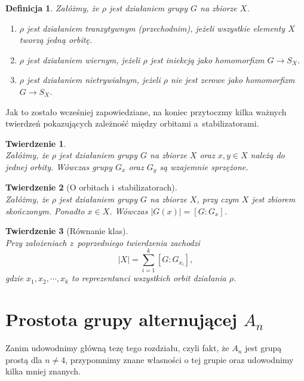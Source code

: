 \documentclass[licencjacka]{pracamgr}
\newtheorem{deff}{Definicja}[section]
\newtheorem{thh}{Twierdzenie}[section]
\begin{document}
\begin{deff}
	Załóżmy, że $\rho$ jest działaniem grupy $G$ na zbiorze $X$.
	\begin{enumerate}[label=\alph*)]
	 \item \emph{$\rho$ jest działaniem tranzytywnym (przechodnim)}, jeżeli wszystkie elementy $X$ tworzą jedną orbitę.
	 \item \emph{$\rho$ jest działaniem wiernym}, jeżeli $\rho$ jest iniekcją jako homomorfizm $G \to S_X$.
	 \item \emph{$\rho$ jest działaniem nietrywialnym}, jeżeli $\rho$ nie jest zerowe jako homomorfizm $G \to S_X$.
	\end{enumerate}
\end{deff}

Jak to zostało wcześniej zapowiedziane, na koniec przytoczmy kilka ważnych twierdzeń pokazujących zależność między orbitami a~stabilizatorami.

\begin{thh}\label{conj_stab} $ $\\
	Załóżmy, że $\rho$ jest działaniem grupy $G$ na zbiorze $X$ oraz $x, y \in X$ należą do jednej orbity.
	Wówczas grupy $G_x$ oraz $G_y$ są wzajemnie sprzężone.
\end{thh}

\begin{thh}[O orbitach i~stabilizatorach] $ $\\
	Załóżmy, że $\rho$ jest działaniem grupy $G$ na zbiorze $X$, przy czym $X$ jest zbiorem skończonym.
	Ponadto $x \in X$. 
	Wówczas $|G(x)| = [G : G_x]$.
\end{thh}

\begin{thh}[Równanie klas] $ $\\
	Przy założeniach z~poprzedniego twierdzenia zachodzi
	$$ |X| = \sum_{i=1}^k [G : G_{x_i}] ,$$
	gdzie $x_1, x_2, \cdots, x_k$ to reprezentanci wszystkich orbit działania $\rho$.
\end{thh}



\chapter{Prostota grupy alternującej $A_n$}

Zanim udowodnimy główną tezę tego rozdziału, czyli fakt, że $A_n$ jest grupą prostą dla $n \ne 4$,
przypomnimy znane własności o tej grupie oraz udowodnimy kilka mniej znanych.
\end{document}
